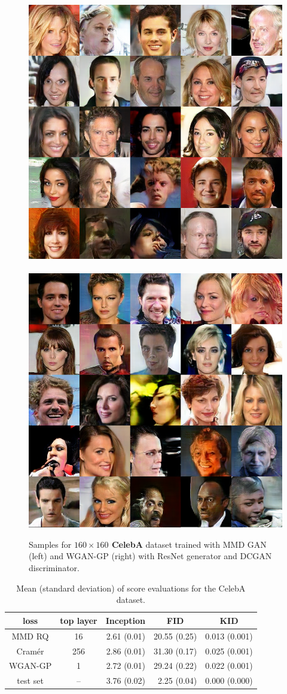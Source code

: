 \documentclass[xcolor={table}]{beamer}
\begin{document}
\begin{frame}{}
\begin{columns}[T, totalwidth=\textwidth]
\begin{column}{.32\textwidth}
\begin{figure}
      ~
      \includegraphics[width=.32\columnwidth]{samples/celeba-wgan-25.png}
      ~
      \includegraphics[width=.32\columnwidth]{samples/celeba-cramer-25.png}
      \caption{Samples for \textbf{$160 \times 160$ CelebA} dataset trained with 
               MMD GAN (left) and WGAN-GP (right) with ResNet generator and DCGAN discriminator.}
    \end{figure}
    \vspace*{-1cm}
    \begin{table}
      \centering
      \caption{Mean (standard deviation) of score evaluations for the CelebA dataset.}
      \label{tab:celeba-scores}
      \begin{tabular}{cc|rrr}
        loss & top layer & \multicolumn{1}{c}{Inception} & \multicolumn{1}{c}{FID} & \multicolumn{1}{c}{KID} \\
        \hline
        MMD RQ   &   16 &    2.61  (0.01) &   20.55  (0.25) &   0.013  (0.001)\\
        Cram\'er &  256 &    2.86  (0.01) &   31.30  (0.17) &   0.025  (0.001)\\
        WGAN-GP  & 1    &    2.72  (0.01) &   29.24  (0.22) &   0.022  (0.001)\\
        test set & --   &    3.76  (0.02) &    2.25  (0.04) &   0.000  (0.000)\\
    \end{tabular}
\end{table}
  \end{column}


\end{columns}
\end{frame}
\end{document}

